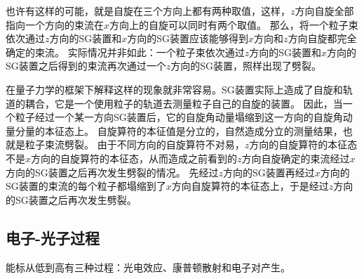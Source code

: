 也许有这样的可能，就是自旋在三个方向上都有两种取值，这样，$z$方向自旋全部指向一个方向的束流在$x$方向上的自旋可以同时有两个取值。
那么，将一个粒子束依次通过$z$方向的SG装置和$x$方向的SG装置应该能够得到$x$方向和$z$方向自旋都完全确定的束流。
实际情况并非如此：一个粒子束依次通过$z$方向的SG装置和$x$方向的SG装置之后得到的束流再次通过一个$z$方向的SG装置，照样出现了劈裂。

在量子力学的框架下解释这样的现象就非常容易。SG装置实际上造成了自旋和轨道的耦合，它是一个使用粒子的轨道去测量粒子自己的自旋的装置。
因此，当一个粒子经过一个某一方向SG装置后，它的自旋角动量塌缩到这一方向的自旋角动量分量的本征态上。
自旋算符的本征值是分立的，自然造成分立的测量结果，也就是粒子束流劈裂。
由于不同方向的自旋算符不对易，$z$方向的自旋算符的本征态不是$x$方向的自旋算符的本征态，从而造成之前看到的$z$方向自旋确定的束流经过$x$方向的SG装置之后再次发生劈裂的情况。
先经过$z$方向的SG装置再经过$x$方向的SG装置的束流的每个粒子都塌缩到了$x$方向自旋算符的本征态上，于是经过$z$方向的SG装置之后再次发生劈裂。

\subsection{电子-光子过程}

能标从低到高有三种过程：光电效应、康普顿散射和电子对产生。


